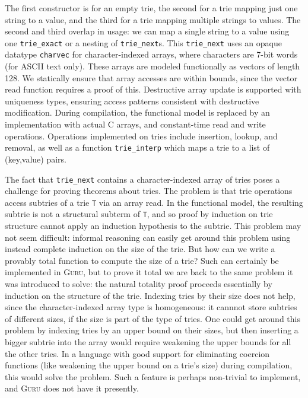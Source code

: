 \documentclass[9pt,natbib]{sigplanconf}
\begin{document}
\noindent The first constructor is for an empty trie, the second for a
trie mapping just one string to a value, and the third for a trie
mapping multiple strings to values.  The second and third overlap in
usage: we can map a single string to a value using one
\texttt{trie\_exact} or a nesting of \texttt{trie\_next}s.  This
\texttt{trie\_next} uses an opaque datatype \texttt{charvec} for
character-indexed arrays, where characters are 7-bit words (for ASCII
text only).  These arrays are modeled functionally as vectors of
length 128.  We statically ensure that array accesses are within bounds,
since the vector read function requires a proof of this.  Destructive
array update is supported with uniqueness types, ensuring access
patterns consistent with destructive modification.  During
compilation, the functional model is replaced by an implementation
with actual C arrays, and constant-time read and write operations.
Operations implemented on tries include insertion, lookup, and
removal, as well as a function \texttt{trie\_interp} which maps a trie
to a list of (key,value) pairs.

The fact that \texttt{trie\_next} contains a character-indexed array
of tries poses a challenge for proving theorems about tries.  The
problem is that trie operations access subtries of a trie \texttt{T}
via an array read.  In the functional model, the resulting subtrie is
not a structural subterm of \texttt{T}, and so proof by induction on
trie structure cannot apply an induction hypothesis to the subtrie.
This problem may not seem difficult: informal reasoning can easily get
around this problem using instead complete induction on the size of
the trie.  But how can we write a provably total function to compute
the size of a trie?  Such can certainly be implemented in
\textsc{Guru}, but to prove it total we are back to the same problem
it was introduced to solve: the natural totality proof proceeds
essentially by induction on the structure of the trie.  Indexing tries
by their size does not help, since the character-indexed array type is
homogeneous: it cannnot store subtries of different sizes, if the size
is part of the type of tries.  One could get around this problem by
indexing tries by an upper bound on their sizes, but then inserting a
bigger subtrie into the array would require weakening the upper bounds
for all the other tries.  In a language with good support for
eliminating coercion functions (like weakening the upper bound on a
trie's size) during compilation, this would solve the problem.  Such a
feature is perhaps non-trivial to implement, and \textsc{Guru} does
not have it presently.
\end{document}
